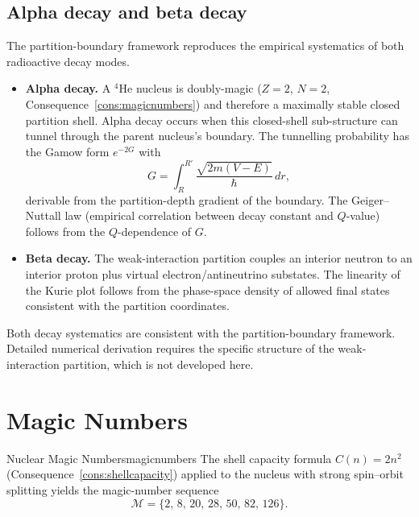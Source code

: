 \subsection{Alpha decay and beta decay}
\label{subsec:alphabeta}

The partition-boundary framework reproduces the empirical systematics of both
radioactive decay modes.

\begin{itemize}
\item \textbf{Alpha decay.}  A $^{4}$He nucleus is doubly-magic ($Z=2$, $N=2$,
  Consequence~\ref{cons:magicnumbers}) and therefore a maximally stable closed
  partition shell.  Alpha decay occurs when this closed-shell sub-structure can
  tunnel through the parent nucleus's boundary.  The tunnelling probability has
  the Gamow form $e^{-2G}$ with
  \[
    G = \int_{R}^{R'}\frac{\sqrt{2m(V-E)}}{\hbar}\,dr,
  \]
  derivable from the partition-depth gradient of the boundary.  The
  Geiger--Nuttall law (empirical correlation between decay constant and
  $Q$-value) follows from the $Q$-dependence of $G$.

\item \textbf{Beta decay.}  The weak-interaction partition couples an interior
  neutron to an interior proton plus virtual electron/antineutrino substates.
  The linearity of the Kurie plot follows from the phase-space density of
  allowed final states consistent with the partition coordinates.
\end{itemize}

Both decay systematics are consistent with the partition-boundary framework.
Detailed numerical derivation requires the specific structure of the
weak-interaction partition, which is not developed here.

\section{Magic Numbers}
\label{sec:magicnumbers}

\begin{consequence}{Nuclear Magic Numbers}{magicnumbers}
The shell capacity formula $C(n)=2n^{2}$ (Consequence~\ref{cons:shellcapacity})
applied to the nucleus with strong spin--orbit splitting yields the magic-number
sequence
\begin{equation}
  \mathcal{M} = \{2,\,8,\,20,\,28,\,50,\,82,\,126\}.
  \label{eq:magicnumbers}
\end{equation}
\end{consequence}

